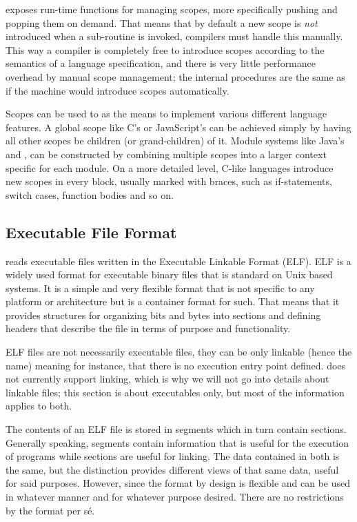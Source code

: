 \thename{} exposes run-time functions for managing scopes, more specifically
pushing and popping them on demand. That means that by default a new scope is
\emph{not} introduced when a sub-routine is invoked, compilers must handle this
manually. This way a compiler is completely free to introduce scopes according
to the semantics of a language specification, and there is very little
performance overhead by manual scope management; the internal procedures are the
same as if the machine would introduce scopes automatically.

Scopes can be used to as the means to implement various different language
features. A global scope like C's or JavaScript's can be achieved simply by
having all other scopes be children (or grand-children) of it. Module systems
like Java's  and , can be constructed by combining
multiple scopes into a larger context specific for each module. On a more
detailed level, C-like languages introduce new scopes in every block, usually
marked with braces, such as if-statements, switch cases, function bodies and so
on.

\subsection{Executable File Format}

\thename{} reads executable files written in the Executable Linkable Format
(ELF). ELF is a widely used format for executable binary files that is standard
on Unix based systems\cite{wiki-elf}. It is a simple and very flexible format
that is not specific to any platform or architecture but is a container format
for such. That means that it provides structures for organizing bits and bytes
into sections and defining headers that describe the file in terms of purpose
and functionality.

ELF files are not necessarily executable files, they can be only linkable (hence
the name) meaning for instance, that there is no execution entry point
defined. \thename{} does not currently support linking, which is why we will not
go into details about linkable files; this section is about executables only,
but most of the information applies to both.

The contents of an ELF file is stored in segments which in turn contain
sections. Generally speaking, segments contain information that is useful for
the execution of programs while sections are useful for linking. The data
contained in both is the same, but the distinction provides different views of
that same data, useful for said purposes\cite{elf-spec}. However, since the
format by design is flexible and can be used in whatever manner and for whatever
purpose desired. There are no restrictions by the format per s\'e.

